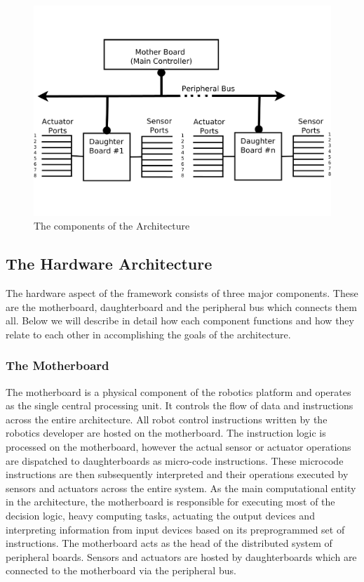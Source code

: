 \begin{figure}[h]
  \begin{center}
    \includegraphics[width=1.0\columnwidth]{Figures/system_block_diagram.pdf}
    \caption{The components of the \xten Architecture}
  \end{center}
\end{figure}

\subsection{The Hardware Architecture} %
\label{sub:the_hardware_architecture}
The hardware aspect of the \xten framework consists of three major components. These are the motherboard, daughterboard and the peripheral bus which connects them all. Below we will describe in detail how each component functions and how they relate to each other in accomplishing the goals of the architecture.



	\subsubsection{The Motherboard} %
	\label{ssub:the_motherboard}
	The motherboard is a physical component of the robotics platform and operates as the single central processing unit. It controls the flow of data and instructions across the entire \xten architecture. All robot control instructions written by the robotics developer are hosted on the motherboard. The instruction logic is processed on the motherboard, however the actual sensor or actuator operations are dispatched to daughterboards as micro-code instructions. These microcode instructions are then subsequently interpreted and their operations executed by sensors and actuators across the entire system. As the main computational entity in the \xten architecture, the motherboard is responsible for executing most of the decision logic, heavy computing tasks, actuating the output devices and interpreting information from input devices based on its preprogrammed set of instructions.
The motherboard acts as the head of the distributed system of peripheral boards. Sensors and actuators are hosted by daughterboards which are connected to the motherboard via the peripheral bus. 
 
